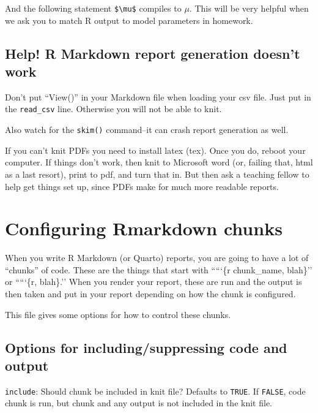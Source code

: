 \documentclass[
  letterpaper,
  DIV=11,
  numbers=noendperiod]{scrreprt}
\begin{document}
And the following statement \texttt{\$\textbackslash{}mu\$} compiles to
\(\mu\). This will be very helpful when we ask you to match R output to
model parameters in homework.

\section{Help! R Markdown report generation doesn't
work}\label{help-r-markdown-report-generation-doesnt-work}

Don't put ``View()'' in your Markdown file when loading your csv file.
Just put in the \texttt{read\_csv} line. Otherwise you will not be able
to knit.

Also watch for the \texttt{skim()} command--it can crash report
generation as well.

If you can't knit PDFs you need to install latex (tex). Once you do,
reboot your computer. If things don't work, then knit to Microsoft word
(or, failing that, html as a last resort), print to pdf, and turn that
in. But then ask a teaching fellow to help get things set up, since PDFs
make for much more readable reports.

\subsection{}\label{section}

\chapter{Configuring Rmarkdown
chunks}\label{configuring-rmarkdown-chunks}

When you write R Markdown (or Quarto) reports, you are going to have a
lot of ``chunks'' of code. These are the things that start with `````\{r
chunk\_name, blah\}'' or `````\{r, blah\}.'' When you render your
report, these are run and the output is then taken and put in your
report depending on how the chunk is configured.

This file gives some options for how to control these chunks.

\section{Options for including/suppressing code and
output}\label{options-for-includingsuppressing-code-and-output}

\texttt{include}: Should chunk be included in knit file? Defaults to
\texttt{TRUE}. If \texttt{FALSE}, code chunk is run, but chunk and any
output is not included in the knit file.
\end{document}
